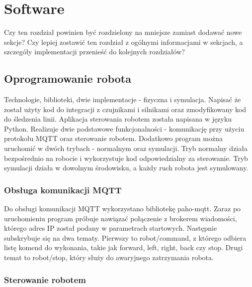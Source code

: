 
\chapter{Software}
\label{cha:software}

Czy ten rozdział powinien być rozdzielony na mniejsze zamiast dodawać nowe sekcje? Czy lepiej zostawić ten rozdział z ogólnymi informacjami w sekcjach, a szczegóły implementacji przenieść do kolejnych rozdziałów?


\section{Oprogramowanie robota}
\label{sec:oprogramowanieRobota}

Technologie, biblioteki, dwie implementacje - fizyczna i symulacja. Napisać że został użyty kod do integracji z czujnikami i silnikami oraz zmodyfikowany kod do śledzenia linii.
Aplikacja sterowania robotem została napisana w języku Python. Realizuje dwie podstawowe funkcjonalności - komunikację przy użyciu protokołu MQTT oraz sterowanie robotem. Dodatkowo program można uruchomić w dwóch trybach - normalnym oraz symulacji. Tryb normalny działa bezpośrednio na robocie i wykorzystuje kod odpowiedzialny za sterowanie. Tryb symulacji działa w dowolnym środowisku, a każdy ruch robota jest symulowany. 


\subsection{Obsługa komunikacji MQTT}
\label{sec:komunikacjaMqtt}

Do obsługi komunikacji MQTT wykorzystano bibliotekę paho-mqtt. Zaraz po uruchomieniu program próbuje nawiązać połączenie z brokerem wiadomości, którego adres IP został podany w parametrach startowych. Następnie subskrybuje się na dwa tematy. Pierwszy to robot/command, z którego odbiera listę komend do wykonania, takie jak forward, left, right, back czy stop. Drugi temat to robot/stop, który służy do awaryjnego zatrzymania robota.


\subsection{Sterowanie robotem}
\label{sec:sterowanieRobotem}

